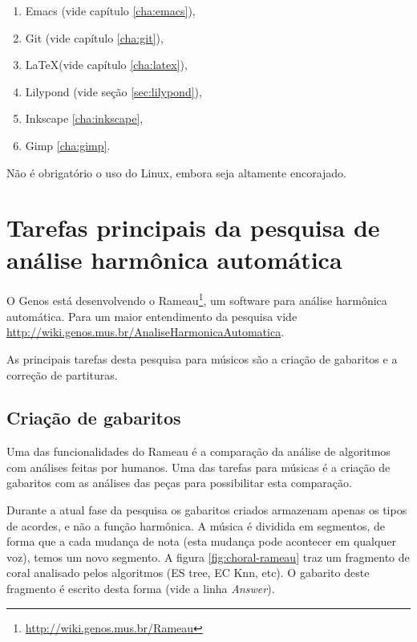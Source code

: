 \documentclass[12pt,brazil]{book}
\newcommand{\eng}[1]{\textit{#1}}
\begin{document}
\begin{enumerate}
\item Emacs (vide capítulo \ref{cha:emacs}),
\item Git (vide capítulo \ref{cha:git}),
\item \LaTeX (vide capítulo \ref{cha:latex}),
\item Lilypond (vide seção \ref{sec:lilypond}),
\item Inkscape \ref{cha:inkscape},
\item Gimp \ref{cha:gimp}.
\end{enumerate}

Não é obrigatório o uso do Linux, embora seja altamente encorajado.

\section{Tarefas principais da pesquisa de análise harmônica automática}
\label{sec:taref-princ-da}

O Genos está desenvolvendo o
Rameau\footnote{\url{http://wiki.genos.mus.br/Rameau}}, um software
para análise harmônica automática. Para um maior entendimento da
pesquisa vide
\url{http://wiki.genos.mus.br/AnaliseHarmonicaAutomatica}.

As principais tarefas desta pesquisa para músicos são a criação de
gabaritos e a correção de partituras.

\subsection{Criação de gabaritos}
\label{sec:criacao-de-gabaritos}

Uma das funcionalidades do Rameau é a comparação da análise de
algoritmos com análises feitas por humanos. Uma das tarefas para
músicas é a criação de gabaritos com as análises das peças para
possibilitar esta comparação.

Durante a atual fase da pesquisa os gabaritos criados armazenam apenas
os tipos de acordes, e não a função harmônica. A música é dividida em
segmentos, de forma que a cada mudança de nota (esta mudança pode
acontecer em qualquer voz), temos um novo segmento. A figura
\ref{fig:choral-rameau} traz um fragmento de coral analisado pelos
algoritmos (ES tree, EC Knn, etc). O gabarito deste fragmento é
escrito desta forma (vide a linha \eng{Answer}).
\end{document}
